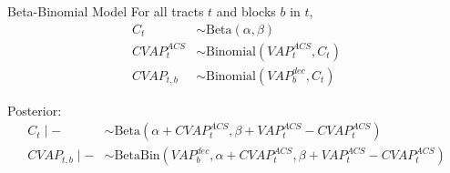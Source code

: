 \documentclass[10pt]{beamer}
\begin{document}
\begin{frame}{Beta-Binomial Model}
For all tracts $t$ and blocks $b$ in $t$,
\begin{align*}
		C_t &\sim \text{Beta}(\alpha,\beta) \\
		CVAP^{ACS}_t &\sim \text{Binomial}(VAP^{ACS}_t, C_t) \\
		CVAP_{t,b} &\sim \text{Binomial}(VAP^{dec}_b, C_t)
\end{align*}

Posterior:
\begin{align*}
	C_t \mid - &\sim \text{Beta}(\alpha + CVAP^{ACS}_t, \beta +VAP^{ACS}_t - CVAP^{ACS}_t) \\
	CVAP_{t,b} \mid - &\sim \text{BetaBin}(VAP^{dec}_b, \alpha + CVAP^{ACS}_t, \beta +VAP^{ACS}_t - CVAP^{ACS}_t)
\end{align*}

\end{frame}

%	
%	
%	
\end{document}
